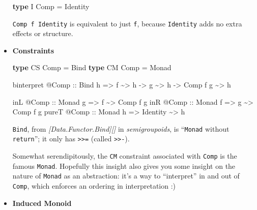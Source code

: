 \documentclass[]{article}
\newenvironment{Shaded}{}{}
\newcommand{\DataTypeTok}[1]{\textcolor[rgb]{0.56,0.13,0.00}{#1}}
\newcommand{\KeywordTok}[1]{\textcolor[rgb]{0.00,0.44,0.13}{\textbf{#1}}}
\newcommand{\NormalTok}[1]{#1}
\newcommand{\OperatorTok}[1]{\textcolor[rgb]{0.40,0.40,0.40}{#1}}
\newcommand{\OtherTok}[1]{\textcolor[rgb]{0.00,0.44,0.13}{#1}}
\begin{document}
\begin{itemize}
\begin{Shaded}
\begin{Highlighting}[]
\KeywordTok{type} \DataTypeTok{I} \DataTypeTok{Comp} \OtherTok{=} \DataTypeTok{Identity}
\end{Highlighting}
\end{Shaded}

  \texttt{Comp\ f\ Identity} is equivalent to just \texttt{f}, because
  \texttt{Identity} adds no extra effects or structure.
\item
  \textbf{Constraints}

\begin{Shaded}
\begin{Highlighting}[]
\KeywordTok{type} \DataTypeTok{CS} \DataTypeTok{Comp} \OtherTok{=} \DataTypeTok{Bind}
\KeywordTok{type} \DataTypeTok{CM} \DataTypeTok{Comp} \OtherTok{=} \DataTypeTok{Monad}

\NormalTok{binterpret }\OperatorTok{@}\DataTypeTok{Comp}
\OtherTok{    ::} \DataTypeTok{Bind}\NormalTok{ h}
    \OtherTok{=>}\NormalTok{ f }\OperatorTok{\textasciitilde{}>}\NormalTok{ h}
    \OtherTok{{-}>}\NormalTok{ g }\OperatorTok{\textasciitilde{}>}\NormalTok{ h}
    \OtherTok{{-}>} \DataTypeTok{Comp}\NormalTok{ f g }\OperatorTok{\textasciitilde{}>}\NormalTok{ h}

\NormalTok{inL   }\OperatorTok{@}\DataTypeTok{Comp}\OtherTok{ ::} \DataTypeTok{Monad}\NormalTok{ g }\OtherTok{=>}\NormalTok{ f        }\OperatorTok{\textasciitilde{}>} \DataTypeTok{Comp}\NormalTok{ f g}
\NormalTok{inR   }\OperatorTok{@}\DataTypeTok{Comp}\OtherTok{ ::} \DataTypeTok{Monad}\NormalTok{ f }\OtherTok{=>}\NormalTok{ g        }\OperatorTok{\textasciitilde{}>} \DataTypeTok{Comp}\NormalTok{ f g}
\NormalTok{pureT }\OperatorTok{@}\DataTypeTok{Comp}\OtherTok{ ::} \DataTypeTok{Monad}\NormalTok{ h }\OtherTok{=>} \DataTypeTok{Identity} \OperatorTok{\textasciitilde{}>}\NormalTok{ h}
\end{Highlighting}
\end{Shaded}

  \texttt{Bind}, from \emph{{[}Data.Functor.Bind{]}{[}{]}} in
  \emph{semigroupoids}, is ``\texttt{Monad} without \texttt{return}''; it only
  has \texttt{\textgreater{}\textgreater{}=} (called
  \texttt{\textgreater{}\textgreater{}-}).

  Somewhat serendipitously, the \texttt{CM} constraint associated with
  \texttt{Comp} is the famous \texttt{Monad}. Hopefully this insight also gives
  you some insight on the nature of \texttt{Monad} as an abstraction: it's a way
  to ``interpret'' in and out of \texttt{Comp}, which enforces an ordering in
  interpretation :)
\item
  \textbf{Induced Monoid}


\end{itemize}
\end{document}
